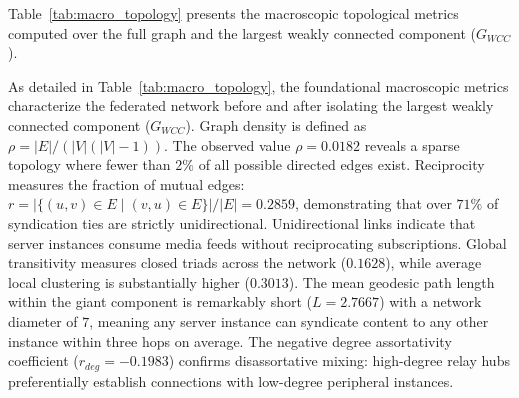 \documentclass[conference]{IEEEtran}
\begin{document}
Table~\ref{tab:macro_topology} presents the macroscopic topological metrics computed over the full graph and the largest weakly connected component ($G_{WCC}$).

\begin{table}[htbp]
\caption{Macroscopic Structural Metrics of the Federated Network Graph}
\label{tab:macro_topology}
\centering
{}
\end{table}

As detailed in Table~\ref{tab:macro_topology}, the foundational macroscopic metrics characterize the federated network before and after isolating the largest weakly connected component ($G_{WCC}$). Graph density is defined as $\rho = |E| / (|V|(|V|-1))$. The observed value $\rho = 0.0182$ reveals a sparse topology where fewer than $2\%$ of all possible directed edges exist. Reciprocity measures the fraction of mutual edges: $r = |\{(u,v) \in E \mid (v,u) \in E\}| / |E| = 0.2859$, demonstrating that over $71\%$ of syndication ties are strictly unidirectional. Unidirectional links indicate that server instances consume media feeds without reciprocating subscriptions. Global transitivity measures closed triads across the network ($0.1628$), while average local clustering is substantially higher ($0.3013$). The mean geodesic path length within the giant component is remarkably short ($L = 2.7667$) with a network diameter of $7$, meaning any server instance can syndicate content to any other instance within three hops on average. The negative degree assortativity coefficient ($r_{deg} = -0.1983$) confirms disassortative mixing: high-degree relay hubs preferentially establish connections with low-degree peripheral instances.
\end{document}

